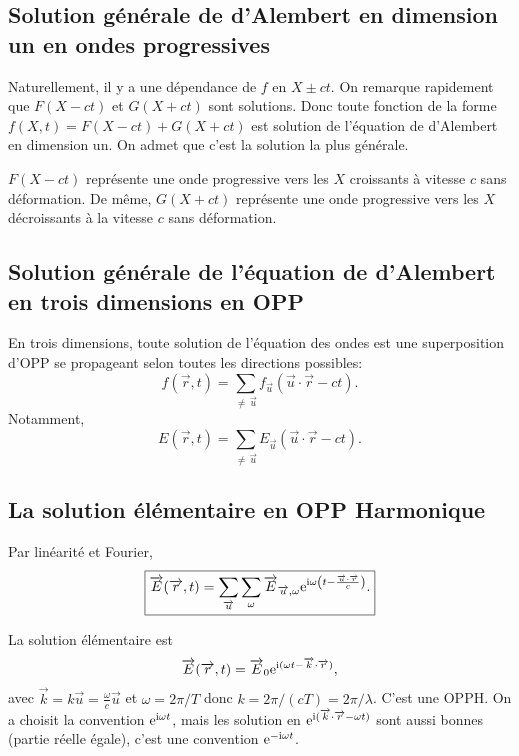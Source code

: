 \subsection{Solution générale de d'Alembert en dimension un en ondes progressives}

Naturellement, il y a une dépendance de $f$ en $X\pm ct$. On remarque rapidement que $F(X-ct)$ et $G(X+ct)$ sont solutions. Donc toute fonction de la forme $f(X,t)=F(X-ct)+G(X+ct)$ est solution de l'équation de d'Alembert en dimension un. On admet que c'est la solution la plus générale.

$F(X-ct)$ représente une onde progressive vers les $X$ croissants à vitesse $c$ sans déformation. De même, $G(X+ct)$ représente une onde progressive vers les $X$ décroissants à la vitesse $c$ sans déformation.

\subsection{Solution générale de l'équation de d'Alembert en trois dimensions en OPP}

En trois dimensions, toute solution de l'équation des ondes est une superposition d'OPP se propageant selon toutes les directions possibles:
\begin{equation}
    \boxed{
        f(\vec{r},t)=\sum_{\neq\,\vec{u}}f_{\vec{u}}(\vec{u}\cdot\vec{r}-ct).
    }
\end{equation}
Notamment, 
\begin{equation}
    \boxed{
        E(\vec{r},t)=\sum_{\neq\,\vec{u}}E_{\vec{u}}(\vec{u}\cdot\vec{r}-ct).
    }
\end{equation}

\subsection{La solution élémentaire en OPP Harmonique}

Par linéarité et Fourier, 
\begin{equation}
    \boxed{
        \protect\overrightarrow{{E}}(\protect\overrightarrow{{r}},t)=\sum_{\protect\overrightarrow{{u}}}\sum_{\omega}\protect\overrightarrow{{E}}_{\protect\overrightarrow{{u}},\omega}\mathrm{e}^{\mathrm{i}\omega\left(t-\frac{\protect\overrightarrow{{u}}\cdot\protect\overrightarrow{{r}}}{c}\right)}.
    }
\end{equation}

La solution élémentaire est
\begin{equation}
    \protect\overrightarrow{{E}}(\protect\overrightarrow{{r}},t)=\protect\overrightarrow{{E}}_{0}\mathrm{e}^{\mathrm{i}(\omega t-\protect\overrightarrow{{k}}\cdot\protect\overrightarrow{{r}})},
\end{equation}
avec $\vec{k}=k\vec{u}=\frac{\omega}{c}\vec{u}$ et $\omega=2\pi/T$ donc $k=2\pi/(cT)=2\pi / \lambda$. C'est une OPPH. On a choisit la convention $\mathrm{e}^{\mathrm{i}\omega t}$, mais les solution en $\mathrm{e}^{\mathrm{i}(\protect\overrightarrow{{k}}\cdot\protect\overrightarrow{{r}}-\omega t)}$ sont aussi bonnes (partie réelle égale), c'est une convention $\mathrm{e}^{-\mathrm{i}\omega t}$.

